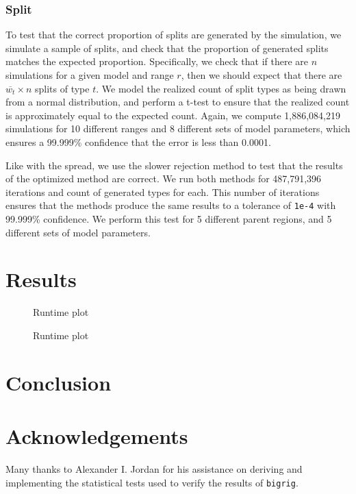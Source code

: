 \documentclass{article}
\newcommand{\bigrig}{\texttt{bigrig}}
\begin{document}
\subsubsection{Split}

To test that the correct proportion of splits are generated by the simulation,
we simulate a sample of splits, and check that the proportion of generated
splits matches the expected proportion.
Specifically, we check that if there are \(n\) simulations for a given model
and range \( r \), then we should expect that there are \(\overline{w_t} \times
n\) splits of type \( t \).
We model the realized count of split types as being drawn from a normal
distribution, and perform a t-test to ensure that the realized count is
approximately equal to the expected count.
Again, we compute 1,886,084,219 simulations for 10 different ranges and 8
different sets of model parameters, which ensures a 99.999\% confidence that
the error is less than 0.0001.

Like with the spread, we use the slower rejection method to test that the
results of the optimized method are correct.
We run both methods for 487,791,396 iterations and count of generated types for
each.
This number of iterations ensures that the methods produce the same results to
a tolerance of \texttt{1e-4} with 99.999\% confidence.
We perform this test for 5 different parent regions, and 5 different sets of
model parameters.

\section{Results}

\begin{figure}
    \centering
    
    \caption{Runtime plot}\label{fig:runtime-taxa}
\end{figure}

\begin{figure}
    \centering
    
    \caption{Runtime plot}\label{fig:runtime-regions}
\end{figure}

\section{Conclusion}

\section{Acknowledgements}

Many thanks to Alexander I. Jordan for his assistance on deriving and
implementing the statistical tests used to verify the results of \bigrig{}.


\end{document}

